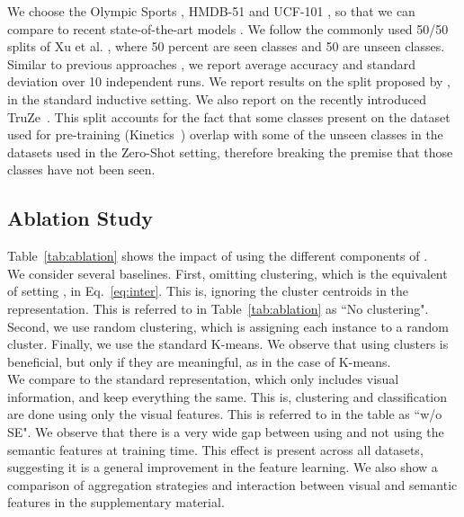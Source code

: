 \documentclass[runningheads]{llncs}
\begin{document}
We choose the Olympic Sports \cite{olympics}, HMDB-51 \cite{hmdb} and UCF-101 \cite{ucf101}, so that we can compare to recent state-of-the-art models \cite{gan2016learning,OD,qin2017zero}. We follow the commonly used 50/50 splits of Xu et al. \cite{xu2017transductive}, where 50 percent are seen classes and 50 are unseen classes. Similar to previous approaches \cite{zhu2018towards,gan2016learning,qin2017zero,mettes2017spatial,kodirov2015unsupervised}, we report average accuracy and standard deviation over 10 independent runs. We report results on the split proposed by \cite{xian2017zero}, in the standard inductive setting. We also report on the recently introduced TruZe~\cite{truze}. This split accounts for the fact that some classes present on the dataset used for pre-training (Kinetics~\cite{i3d}) overlap with some of the unseen classes in the datasets used in the Zero-Shot setting, therefore breaking the premise that those classes have not been seen. 

\subsection{Ablation Study}
\label{subsec:ablation}








Table~\ref{tab:ablation} shows the impact of using the different components of \MethodName. \\

 We consider several baselines. First, omitting clustering, which is the equivalent of setting , in Eq.~\ref{eq:inter}. This is, ignoring the cluster centroids in the representation. This is referred to in Table~\ref{tab:ablation} as ``No clustering".  Second, we use random clustering, which is assigning each instance to a random cluster. Finally, we use the standard K-means. We observe that using clusters is beneficial, but only if they are meaningful, as in the case of K-means. \\
    
 We compare to the standard representation, which only includes visual information, and keep everything the same. This is, clustering and classification are done using only the visual features. This is referred to in the table as ``\MethodName w/o SE". We observe that there is a very wide gap between using and not using the semantic features at training time. This effect is present across all datasets, suggesting it is a general improvement in the feature learning. We also show a comparison of aggregation strategies and interaction between visual and semantic features in the supplementary material.\\
    
\end{document}
